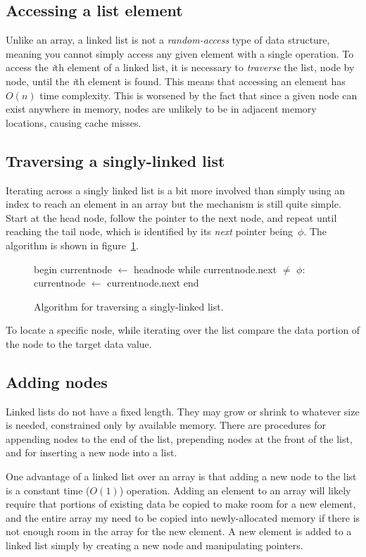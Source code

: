 \documentclass{article}
\begin{document}
  \subsection{Accessing a list element}
  Unlike an array, a linked list is not a \emph{random-access} type of data structure, meaning you cannot simply access any given element with a single operation. To access the \emph{i}th element of a linked list, it is necessary to \emph{traverse} the list, node by node, until the \emph{i}th element is found. This means that accessing an element has $O(n)$ time complexity. This is worsened by the fact that since a given node can exist anywhere in memory, nodes are unlikely to be in adjacent memory locations, causing cache misses.

  \subsection{Traversing a singly-linked list}
  Iterating across a singly linked list is a bit more involved than simply using an index to reach an element in an array but the mechanism is still quite simple. Start at the head node, follow the pointer to the next node, and repeat until reaching the tail node, which is identified by its \emph{next} pointer being~$\phi$. The algorithm is shown in figure~\ref{fig:alg:singlelinkedlist-traverse}.
  \begin{figure}[h]
  \begin{algorithm}
    begin
      currentnode $\gets$ headnode
      while currentnode.next $\ne$ $\phi$:
        currentnode $\gets$ currentnode.next
    end\end{algorithm}
    \caption{Algorithm for traversing a singly-linked list.}
    \label{fig:alg:singlelinkedlist-traverse}
  \end{figure}

  To locate a specific node, while iterating over the list compare the data portion of the node to the target data value.
  \subsection{Adding nodes}
  Linked lists do not have a fixed length. They may grow or shrink to whatever size is needed, constrained only by available memory. There are procedures for appending nodes to the end of the list, prepending nodes at the front of the list, and for inserting a new node into a list.

  One advantage of a linked list over an array is that adding a new node to the list is a constant time ($O(1)$) operation. Adding an element to an array will likely require that portions of existing data be copied to make room for a new element, and the entire array my need to be copied into newly-allocated memory if there is not enough room in the array for the new element. A new element is added to a linked list simply by creating a new node and manipulating pointers.
\end{document}

